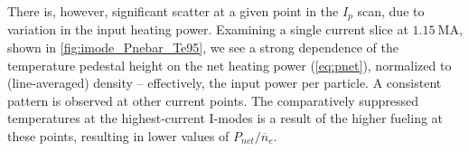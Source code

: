 \begin{figure}
 \pushtooutside
\end{figure}

There is, however, significant scatter at a given point in the $I_p$ scan, due to variation in the input heating power.  Examining a single current slice at $\SI{1.15}{\mega\ampere}$, shown in \cref{fig:imode_Pnebar_Te95}, we see a strong dependence of the temperature pedestal height on the net heating power (\cref{eq:pnet}), normalized to (line-averaged) density -- effectively, the input power per particle.  A consistent pattern is observed at other current points.  The comparatively suppressed temperatures at the highest-current I-modes is a result of the higher fueling at these points, resulting in lower values of $P_{net}/\overline{n}_e$.

